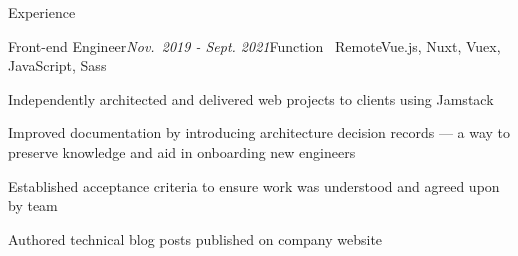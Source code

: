 \documentclass{resume} %
\begin{document}
\begin{rSection}{Experience}

\begin{rSubsection}{Front-end Engineer}{\em Nov.\ 2019 - Sept. 2021}{Function \textbar \ Remote}{Vue.js, Nuxt, Vuex, JavaScript, Sass}


\item Independently architected and delivered web projects to clients using Jamstack
\item Improved documentation by introducing architecture decision records --- a way to preserve knowledge and aid in onboarding new engineers
\item Established acceptance criteria to ensure work was understood and agreed upon by team
\item Authored technical blog posts published on company website
\end{rSubsection}


\end{rSection}
\end{document}
